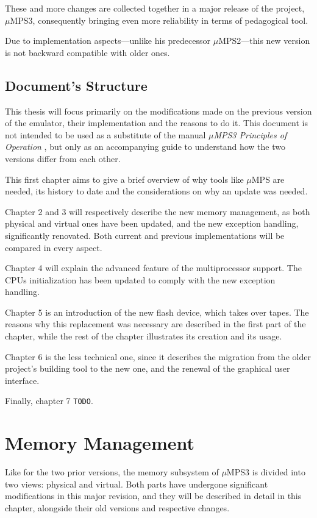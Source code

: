 \documentclass[12pt,a4paper,openright,twoside]{report}
\begin{document}
These and more changes are collected together in a major release of the project, $\mu$MPS3, consequently bringing even more reliability in terms of pedagogical tool.

Due to implementation aspects---unlike his predecessor $\mu$MPS2---this new version is not backward compatible with older ones.

\section{Document's Structure}
This thesis will focus primarily on the modifications made on the previous version of the emulator, their implementation and the reasons to do it.
This document is not intended to be used as a substitute of the manual \textit{$\mu$MPS3 Principles of Operation} \cite{pops}, but only as an accompanying guide to understand how the two versions differ from each other.

This first chapter aims to give a brief overview of why tools like $\mu$MPS are needed, its history to date and the considerations on why an update was needed.

Chapter 2 and 3 will respectively describe the new memory management, as both physical and virtual ones have been updated, and the new exception handling, significantly renovated.
Both current and previous implementations will be compared in every aspect.

Chapter 4 will explain the advanced feature of the multiprocessor support.
The CPUs initialization has been updated to comply with the new exception handling.

Chapter 5 is an introduction of the new flash device, which takes over tapes.
The reasons why this replacement was necessary are described in the first part of the chapter, while the rest of the chapter illustrates its creation and its usage.

Chapter 6 is the less technical one, since it describes the migration from the older project's building tool to the new one, and the renewal of the graphical user interface.

Finally, chapter 7 \texttt{TODO}.

\chapter{Memory Management}
\lhead[\fancyplain{}{\bfseries\thepage}]{\fancyplain{}{\bfseries\rightmark}}
Like for the two prior versions, the memory subsystem of $\mu$MPS3 is divided into two views: physical and virtual.
Both parts have undergone significant modifications in this major revision, and they will be described in detail in this chapter, alongside their old versions and respective changes.
\end{document}
